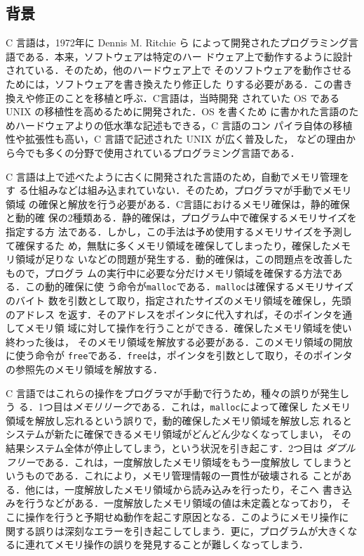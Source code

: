 \subsection{背景}
C 言語\cite{DBLP:books/ph/KernighanR78}は，1972年に Dennis M. Ritchie ら
によって開発されたプログラミング言語である．本来，ソフトウェアは特定のハー
ドウェア上で動作するように設計されている．そのため，他のハードウェア上で
そのソフトウェアを動作させるためには，ソフトウェアを書き換えたり修正した
りする必要がある．この書き換えや修正のことを移植と呼ぶ．C言語は，当時開発
されていた OS である UNIX の移植性を高めるために開発された．OS を書くため
に書かれた言語のためハードウェアよりの低水準な記述もできる，C 言語のコン
パイラ自体の移植性や拡張性も高い，C 言語で記述された UNIX が広く普及した，
などの理由から今でも多くの分野で使用されているプログラミング言語である．

C 言語は上で述べたように古くに開発された言語のため，自動でメモリ管理をす
る仕組みなどは組み込まれていない．そのため，プログラマが手動でメモリ領域
の確保と解放を行う必要がある．C言語におけるメモリ確保は，静的確保と動的確
保の2種類ある．静的確保は，プログラム中で確保するメモリサイズを指定する方
法である．しかし，この手法は予め使用するメモリサイズを予測して確保するた
め，無駄に多くメモリ領域を確保してしまったり，確保したメモリ領域が足りな
いなどの問題が発生する．動的確保は，この問題点を改善したもので，プログラ
ムの実行中に必要な分だけメモリ領域を確保する方法である．この動的確保に使
う命令が\verb|malloc|である．\verb|malloc|は確保するメモリサイズのバイト
数を引数として取り，指定されたサイズのメモリ領域を確保し，先頭のアドレス
を返す．そのアドレスをポインタに代入すれば，そのポインタを通してメモリ領
域に対して操作を行うことができる．確保したメモリ領域を使い終わった後は，
そのメモリ領域を解放する必要がある．このメモリ領域の開放に使う命令が
\verb|free|である．\verb|free|は，ポインタを引数として取り，そのポインタ
の参照先のメモリ領域を解放する．


C 言語ではこれらの操作をプログラマが手動で行うため，種々の誤りが発生しう
る．1つ目は\emph{メモリリーク}である．これは，\verb|malloc|によって確保し
たメモリ領域を解放し忘れるという誤りで，動的確保したメモリ領域を解放し忘
れるとシステムが新たに確保できるメモリ領域がどんどん少なくなってしまい，
その結果システム全体が停止してしまう，という状況を引き起こす．2つ目は
\emph{ダブルフリー}である．これは，一度解放したメモリ領域をもう一度解放し
てしまうというものである．これにより，メモリ管理情報の一貫性が破壊される
ことがある．他には，一度解放したメモリ領域から読み込みを行ったり，そこへ
書き込みを行うなどがある．一度解放したメモリ領域の値は未定義となっており，
そこに操作を行うと予期せぬ動作を起こす原因となる．このようにメモリ操作に
関する誤りは深刻なエラーを引き起こしてしまう．更に，プログラムが大きくな
るに連れてメモリ操作の誤りを発見することが難しくなってしまう．


